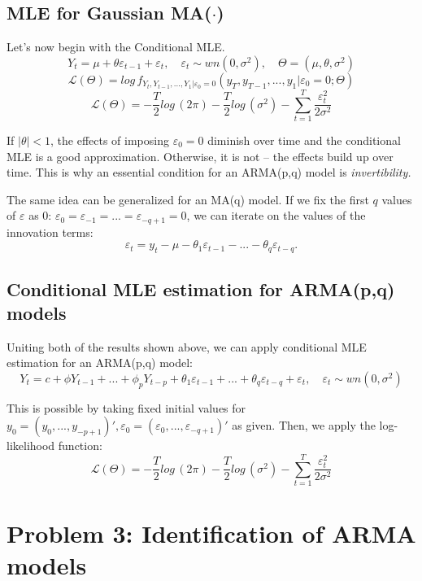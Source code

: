 \documentclass[11pt, a4paper]{report}
\theoremstyle{plain}
\theoremstyle{plain}
\theoremstyle{remark}
\begin{document}
\section{MLE for Gaussian MA($\cdot$)}

Let's now begin with the Conditional MLE. 
$$ Y_t = \mu + \theta \varepsilon_{t-1} + \varepsilon_{t}, \hspace{1em} \varepsilon_{t} \sim wn(0, \sigma^2), \hspace{1em} \Theta = (\mu, \theta, \sigma^2) $$
$$ \mathcal{L}(\Theta) = log \, f_{Y_t, Y_{t-1},..., Y_1 | \varepsilon_0 = 0} (y_T, y_{T-1}, ..., y_1 | \varepsilon_{0} = 0; \Theta) $$ 
$$ \mathcal{L}(\Theta) = -\dfrac{T}{2} log \, (2 \pi) - \dfrac{T}{2} log \, (\sigma^2) - \sum_{t=1}^T \dfrac{\varepsilon_{t}^2}{2 \sigma^2} $$

If $| \theta | < 1$, the effects of imposing $\varepsilon_0 = 0$ diminish over time and the conditional MLE is a good approximation. Otherwise, it is not -- the effects build up over time. This is why an essential condition for an ARMA(p,q) model is \textit{invertibility.}

The same idea can be generalized for an MA(q) model. If we fix the first $q$ values of $\varepsilon$ as 0: $ \varepsilon_0 = \varepsilon_{-1} = ... = \varepsilon_{-q+1} = 0$, we can iterate on the values of the innovation terms:
$$ \varepsilon_t = y_t - \mu - \theta_1 \varepsilon_{t-1} - ... - \theta_q \varepsilon_{t-q}. $$

\section{Conditional MLE estimation for ARMA(p,q) models}

Uniting both of the results shown above, we can apply conditional MLE estimation for an ARMA(p,q) model:
$$ Y_t = c + \phi Y_{t-1} + ... + \phi_p Y_{t-p} + \theta_1 \varepsilon_{t-1} + ... + \theta_q \varepsilon_{t-q} + \varepsilon_t, \hspace{1em} \varepsilon_t \sim wn(0, \sigma^2) $$

This is possible by taking fixed initial values for $y_0 = (y_0, ..., y_{-p+1})', \varepsilon_0 = (\varepsilon_0, ..., \varepsilon_{-q+1})'$ as given. Then, we apply the log-likelihood function:
$$ \mathcal{L} (\Theta) = -\dfrac{T}{2} log \, (2\pi) -\dfrac{T}{2} log \, (\sigma^2) - \sum_{t=1}^{T} \dfrac{\varepsilon_t^2}{2 \sigma^2}$$


\chapter{Problem 3: Identification of ARMA models}
\end{document}
